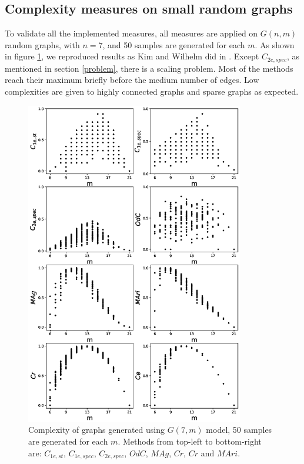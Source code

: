 \documentclass[12pt]{article}
\begin{document}
\subsection{Complexity measures on small random graphs}
\label{complexity}
To validate all the implemented measures, all measures are applied on $G(n,m)$ random graphs, with $n=7$, and 50 samples are generated for each $m$. As shown in figure \ref{fig:small_graphs}, we reproduced results as Kim and Wilhelm did in \cite{KIM20082637}. Except $C_{2e,spec}$, as mentioned in section \ref{problem}, there is a scaling problem. Most of the methods reach their maximum briefly before the medium number of edges. Low complexities are given to highly connected graphs and sparse graphs as expected.\par
\begin{figure}[p!]
    \includegraphics[width=0.85\textwidth]{complexities.eps}
    \vspace*{-0.8in}
    \centering
    \caption{Complexity of graphs generated using $G(7,m)$ model, 50 samples are generated for each $m$. Methods from top-left to bottom-right are: $C_{1e,st}$, $C_{1e,spec}$, $C_{2e,spec}$, $OdC$, $MAg$, $Cr$, $Cr$ and $MAri$.}
    \label{fig:small_graphs}
    \clearpage
\end{figure}
\end{document}

